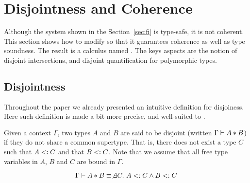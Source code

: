\section{Disjointness and Coherence}
\label{sec:disjoint}

Although the system shown in the Section~\ref{sec:fi} is type-safe, it is not
coherent. This section shows how to modify \name so that it guarantees coherence
as well as type soundness. The result is a calculus named \namedis. The keys
aspects are the notion of disjoint intersections, and disjoint quantification
for polymorphic types.

%
%
%

\subsection{Disjointness} Throughout the paper we already presented an intuitive
definition for disjoiness. Here such definition is made a bit more precise, and
well-suited to \namedis.

\begin{definition}

  Given a context $\Gamma$, two types $A$ and $B$ are said to be disjoint
  (written $\Gamma \vdash A * B$) if they do not share a common supertype. That is,
  there does not exist a type $C$ such that $A <: C$ and that $B <:
  C$. Note that we assume that all free type variables in $A$,
    $B$ and $C$ are bound in $\Gamma$.

  \[\Gamma \vdash A * B \equiv \not \exists C.~A <: C \wedge B <: C\]

\end{definition}

